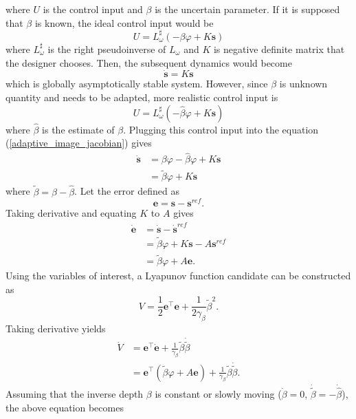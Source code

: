 where $U$ is the control input and $\beta$ is the uncertain parameter. If it is supposed that $\beta$ is known, the ideal control input would be
\begin{equation}
U=L_\omega^\sharp(-\beta\varphi+K\mathbf{s})
\end{equation}
where $L_\omega^\sharp$ is the right pseudoinverse of $L_\omega$ and $K$ is negative definite matrix that the designer chooses. Then, the subsequent dynamics would become
\begin{equation}
\mathbf{\dot{s}}=K\mathbf{s}
\end{equation}
which is globally asymptotically stable system. However, since $\beta$ is unknown quantity and needs to be adapted, more realistic control input is
\begin{equation}
U=L_\omega^\sharp(-\hat{\beta}\varphi+K\mathbf{s})
\end{equation}
where $\hat{\beta}$ is the estimate of $\beta$. Plugging this control input into the equation (\ref{adaptive_image_jacobian}) gives
\begin{align}
\mathbf{\dot{s}}&=\beta\varphi-\hat{\beta}\varphi+K\mathbf{s}
\\&= \tilde{\beta}\varphi+K\mathbf{s}
\end{align}
where $\tilde{\beta}=\beta-\hat{\beta}$. Let the error defined as 
\begin{equation}
\mathbf{e}=\mathbf{s}-\mathbf{s}^{ref}.
\end{equation}
Taking derivative and equating $K$ to $A$ gives
\begin{align}
\dot{\mathbf{e}}&=\dot{\mathbf{s}}-\dot{\mathbf{s}}^{ref}
\\&=\tilde{\beta}\varphi+K\mathbf{s}-A\mathbf{s}^{ref}
\\&=\tilde{\beta}\varphi+A\mathbf{e}.
\end{align}
Using the variables of interest, a Lyapunov function candidate can be constructed as 
\begin{equation}
V=\frac{1}{2}\mathbf{e}^\top\mathbf{e}+\frac{1}{2\gamma_\beta}\tilde{\beta}^2.
\end{equation}
Taking derivative yields
\begin{align}
\dot{V}&=\mathbf{e}^\top\dot{\mathbf{e}}+\frac{1}{\gamma_\beta}\tilde{\beta}\dot{\tilde{\beta}}
\\&=\mathbf{e}^\top(\tilde{\beta}\varphi+A\mathbf{e})+\frac{1}{\gamma_\beta}\tilde{\beta}\dot{\tilde{\beta}}.
\label{vdot2}
\end{align}
Assuming that the inverse depth $\beta$ is constant or slowly moving ($\dot{\beta}=0$, $\dot{\tilde{\beta}}=-\dot{\hat{\beta}}$), the above equation becomes
